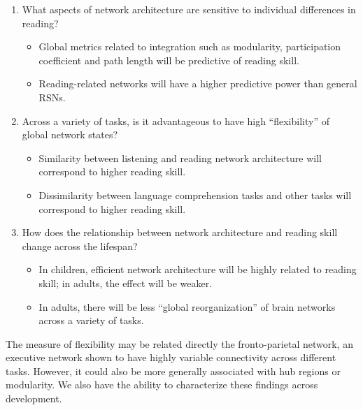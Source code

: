 \begin{enumerate}
	\item What aspects of network architecture are sensitive to individual differences in reading?
	\begin{itemize}
		\item Global metrics related to integration such as modularity, participation coefficient and path length will be predictive of reading skill. 
		\item Reading-related networks will have a higher predictive power than general RSNs.
	\end{itemize}

	\item Across a variety of tasks, is it advantageous to have high ``flexibility'' of global network states? 
	\begin{itemize}
		\item Similarity between listening and reading network architecture will correspond to higher reading skill.
		\item Dissimilarity between language comprehension tasks and other tasks will correspond to higher reading skill.
	\end{itemize}

	\item How does the relationship between network architecture and reading skill change across the lifespan?
	\begin{itemize}
		\item In children, efficient network architecture will be highly related to reading skill; in adults, the effect will be weaker.
		\item In adults, there will be less ``global reorganization'' of brain networks across a variety of tasks.
	\end{itemize}
\end{enumerate}

The measure of flexibility may be related directly the fronto-parietal network, an executive network shown to have highly variable connectivity across different tasks. However, it could also be more generally associated with hub regions or modularity. We also have the ability to characterize these findings across development.